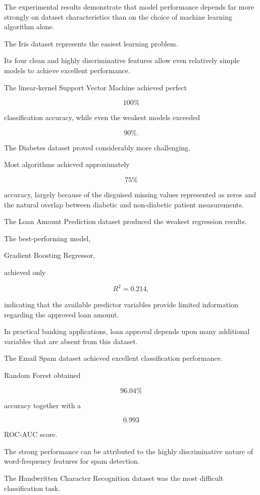 \documentclass[12pt,a4paper]{article}
\begin{document}
The experimental results demonstrate that model performance depends far
more strongly on dataset characteristics than on the choice of machine
learning algorithm alone.

The Iris dataset represents the easiest learning problem.

Its four clean and highly discriminative features allow even relatively
simple models to achieve excellent performance.

The linear-kernel Support Vector Machine achieved perfect

\[
100\%
\]

classification accuracy, while even the weakest models exceeded

\[
90\%.
\]

The Diabetes dataset proved considerably more challenging.

Most algorithms achieved approximately

\[
75\%
\]

accuracy, largely because of the disguised missing values represented as
zeros and the natural overlap between diabetic and non-diabetic patient
measurements.

The Loan Amount Prediction dataset produced the weakest regression
results.

The best-performing model,

Gradient Boosting Regressor,

achieved only

\[
R^2=0.214,
\]

indicating that the available predictor variables provide limited
information regarding the approved loan amount.

In practical banking applications, loan approval depends upon many
additional variables that are absent from this dataset.

The Email Spam dataset achieved excellent classification performance.

Random Forest obtained

\[
96.04\%
\]

accuracy together with a

\[
0.993
\]

ROC-AUC score.

The strong performance can be attributed to the highly discriminative
nature of word-frequency features for spam detection.

The Handwritten Character Recognition dataset was the most difficult
classification task.
\end{document}

